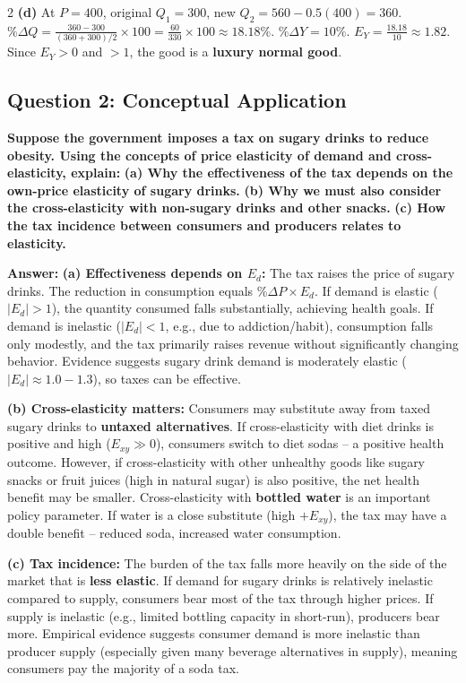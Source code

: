 \documentclass[10pt,a4paper]{article}
\begin{document}
\begin{multicols}{2}
\textbf{(d)} At $P=400$, original $Q_1 = 300$, new $Q_2 = 560 - 0.5(400) = 360$.
$\%\Delta Q = \frac{360-300}{(360+300)/2} \times 100 = \frac{60}{330} \times 100 \approx 18.18\%$. $\%\Delta Y = 10\%$.
$E_Y = \frac{18.18}{10} \approx 1.82$. Since $E_Y > 0$ and $> 1$, the good is a \textbf{luxury normal good}.

\vspace{0.2cm}

\subsection*{Question 2: Conceptual Application}
\textbf{Suppose the government imposes a tax on sugary drinks to reduce obesity. Using the concepts of price elasticity of demand and cross-elasticity, explain:}
\textbf{(a) Why the effectiveness of the tax depends on the own-price elasticity of sugary drinks.}
\textbf{(b) Why we must also consider the cross-elasticity with non-sugary drinks and other snacks.}
\textbf{(c) How the tax incidence between consumers and producers relates to elasticity.}

\vspace{0.1cm}
\textbf{Answer:}
\vspace{0.05cm}
\textbf{(a) Effectiveness depends on $E_d$:} The tax raises the price of sugary drinks. The reduction in consumption equals \%$\Delta P \times E_d$. If demand is elastic ($|E_d| > 1$), the quantity consumed falls substantially, achieving health goals. If demand is inelastic ($|E_d| < 1$, e.g., due to addiction/habit), consumption falls only modestly, and the tax primarily raises revenue without significantly changing behavior. Evidence suggests sugary drink demand is moderately elastic ($|E_d| \approx 1.0 - 1.3$), so taxes can be effective.

\textbf{(b) Cross-elasticity matters:} Consumers may substitute away from taxed sugary drinks to \textbf{untaxed alternatives}. If cross-elasticity with diet drinks is positive and high ($E_{xy} \gg 0$), consumers switch to diet sodas -- a positive health outcome. However, if cross-elasticity with other unhealthy goods like sugary snacks or fruit juices (high in natural sugar) is also positive, the net health benefit may be smaller. Cross-elasticity with \textbf{bottled water} is an important policy parameter. If water is a close substitute (high $+E_{xy}$), the tax may have a double benefit -- reduced soda, increased water consumption.

\textbf{(c) Tax incidence:} The burden of the tax falls more heavily on the side of the market that is \textbf{less elastic}. If demand for sugary drinks is relatively inelastic compared to supply, consumers bear most of the tax through higher prices. If supply is inelastic (e.g., limited bottling capacity in short-run), producers bear more. Empirical evidence suggests consumer demand is more inelastic than producer supply (especially given many beverage alternatives in supply), meaning consumers pay the majority of a soda tax.


\end{multicols}
\end{document}
